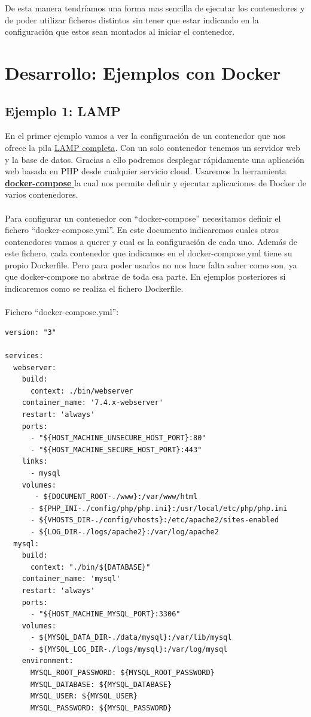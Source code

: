 \documentclass[11pt,a4paper]{article}
\begin{document}
De esta manera tendríamos una forma mas sencilla de ejecutar los contenedores y de poder utilizar ficheros distintos sin tener que estar indicando en la configuración que estos sean montados al iniciar el contenedor.

\section{Desarrollo: Ejemplos con Docker}
\subsection{Ejemplo 1: LAMP}
En el primer ejemplo vamos a ver la configuración de un contenedor que nos ofrece la pila \href{https://github.com/sprintcube/docker-compose-lamp}{LAMP completa}. Con un solo contenedor tenemos un servidor web y la base de datos. Gracias a ello podremos desplegar rápidamente una aplicación web basada en PHP desde cualquier servicio cloud. Usaremos la herramienta \href{https://docs.docker.com/compose/}{\textbf{docker-compose} }la cual nos permite definir y ejecutar aplicaciones de Docker de varios contenedores. \\\\Para configurar un contenedor con ``docker-compose'' necesitamos definir el fichero ``docker-compose.yml''. En este documento indicaremos cuales otros contenedores vamos a querer y cual es la  configuración de cada uno. Además de este fichero, cada contenedor que indicamos en el docker-compose.yml tiene su propio Dockerfile. Pero para poder usarlos no nos hace falta saber como son, ya que docker-compose no abstrae de toda esa parte. En ejemplos posteriores si indicaremos como se realiza el fichero Dockerfile. \\\\
Fichero ``docker-compose.yml'':
\begin{verbatim}
version: "3"

services:
  webserver:
    build: 
      context: ./bin/webserver
    container_name: '7.4.x-webserver'
    restart: 'always'
    ports:
      - "${HOST_MACHINE_UNSECURE_HOST_PORT}:80"
      - "${HOST_MACHINE_SECURE_HOST_PORT}:443"
    links: 
      - mysql
    volumes: 
       - ${DOCUMENT_ROOT-./www}:/var/www/html
      - ${PHP_INI-./config/php/php.ini}:/usr/local/etc/php/php.ini
      - ${VHOSTS_DIR-./config/vhosts}:/etc/apache2/sites-enabled
      - ${LOG_DIR-./logs/apache2}:/var/log/apache2
  mysql:
    build:
      context: "./bin/${DATABASE}"
    container_name: 'mysql'
    restart: 'always'
    ports:
      - "${HOST_MACHINE_MYSQL_PORT}:3306"
    volumes: 
      - ${MYSQL_DATA_DIR-./data/mysql}:/var/lib/mysql
      - ${MYSQL_LOG_DIR-./logs/mysql}:/var/log/mysql
    environment:
      MYSQL_ROOT_PASSWORD: ${MYSQL_ROOT_PASSWORD}
      MYSQL_DATABASE: ${MYSQL_DATABASE}
      MYSQL_USER: ${MYSQL_USER}
      MYSQL_PASSWORD: ${MYSQL_PASSWORD}
\end{verbatim}
\end{document}
